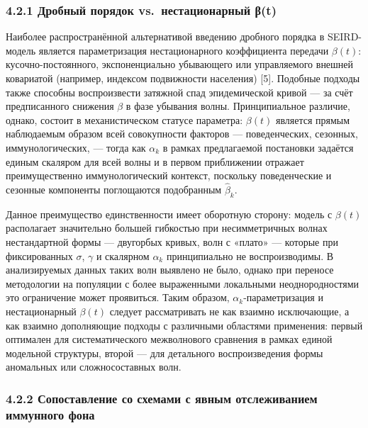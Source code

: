 \documentclass[12pt]{article}
\begin{document}
\subsubsection{4.2.1 Дробный порядок vs.~нестационарный
β(t)}\label{ux434ux440ux43eux431ux43dux44bux439-ux43fux43eux440ux44fux434ux43eux43a-vs.-ux43dux435ux441ux442ux430ux446ux438ux43eux43dux430ux440ux43dux44bux439-ux3b2t}

Наиболее распространённой альтернативой введению дробного порядка в
SEIRD-модель является параметризация нестационарного коэффициента
передачи \(\beta(t)\): кусочно-постоянного, экспоненциально убывающего
или управляемого внешней ковариатой (например, индексом подвижности
населения) {[}5{]}. Подобные подходы также способны воспроизвести
затяжной спад эпидемической кривой --- за счёт предписанного снижения
\(\beta\) в фазе убывания волны. Принципиальное различие, однако,
состоит в механистическом статусе параметра: \(\beta(t)\) является
прямым наблюдаемым образом всей совокупности факторов --- поведенческих,
сезонных, иммунологических, --- тогда как \(\alpha_k\) в рамках
предлагаемой постановки задаётся единым скаляром для всей волны и в
первом приближении отражает преимущественно иммунологический контекст,
поскольку поведенческие и сезонные компоненты поглощаются подобранным
\(\hat{\beta}_k\).

Данное преимущество единственности имеет оборотную сторону: модель с
\(\beta(t)\) располагает значительно большей гибкостью при
несимметричных волнах нестандартной формы --- двугорбых кривых, волн с
«плато» --- которые при фиксированных \(\sigma\), \(\gamma\) и скалярном
\(\alpha_k\) принципиально не воспроизводимы. В анализируемых данных
таких волн выявлено не было, однако при переносе методологии на
популяции с более выраженными локальными неоднородностями это
ограничение может проявиться. Таким образом, \(\alpha_k\)-параметризация
и нестационарный \(\beta(t)\) следует рассматривать не как взаимно
исключающие, а как взаимно дополняющие подходы с различными областями
применения: первый оптимален для систематического межволнового сравнения
в рамках единой модельной структуры, второй --- для детального
воспроизведения формы аномальных или сложносоставных волн.

\subsubsection{4.2.2 Сопоставление со схемами с явным отслеживанием
иммунного
фона}\label{ux441ux43eux43fux43eux441ux442ux430ux432ux43bux435ux43dux438ux435-ux441ux43e-ux441ux445ux435ux43cux430ux43cux438-ux441-ux44fux432ux43dux44bux43c-ux43eux442ux441ux43bux435ux436ux438ux432ux430ux43dux438ux435ux43c-ux438ux43cux43cux443ux43dux43dux43eux433ux43e-ux444ux43eux43dux430}
\end{document}
